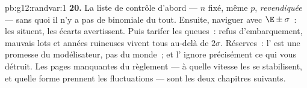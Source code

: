 \begin{solution}{pb:g12:randvar:1}
\textbf{20.} La liste de contrôle d'abord --- $n$ fixé, même $p$,
 \emph{revendiquée} --- sans quoi il n'y a pas de
binomiale du tout. Ensuite, naviguer avec $\E \pm \sigma$~: les
 situent, les écarts avertissent. Puis tarifer les queues~:
refus d'embarquement, mauvais lots et années ruineuses vivent tous
au-delà de $2\sigma$. Réserves~: l' est une promesse du
modélisateur, pas du monde~; et l' ignore précisément ce
qui vous détruit. Les pages manquantes du règlement --- à quelle
vitesse les  se stabilisent, et quelle forme prennent les
fluctuations --- sont les deux chapitres suivants.
\end{solution}
